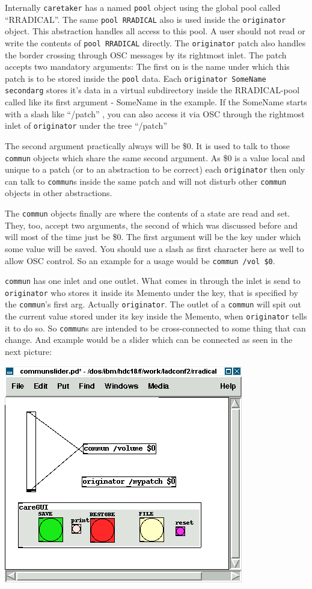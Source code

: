 \documentclass[10pt,english]{scrartcl}
\begin{document}
Internally \texttt{caretaker} has a named \texttt{pool} object using the global pool
called ``RRADICAL''. The same \texttt{pool RRADICAL} also is used inside the
\texttt{originator} object. This abstraction handles all access to this pool. A
user should not read or write the contents of \texttt{pool RRADICAL} directly.
The \texttt{originator} patch also handles the border crossing through OSC
messages by its rightmost inlet. The patch accepts two mandatory
arguments: The first on is the name under which this patch is to be stored
inside the \texttt{pool} data. Each \texttt{originator SomeName secondarg}  stores
it's data in a virtual subdirectory inside the RRADICAL-pool called like
its first argument - SomeName in the example. If the SomeName starts with a
slash like ``/patch'' , you can also access it via OSC through the rightmost inlet of
\texttt{originator} under the tree ``/patch''

The second argument practically always will be {\$}0. It is used to talk to
those \texttt{commun} objects which share the same second argument. As {\$}0 is a
value local and unique to a patch (or to an abstraction to be correct) each
\texttt{originator} then only can talk to \texttt{commun}s inside the same patch and
will not disturb other \texttt{commun} objects in other abstractions.

The \texttt{commun} objects finally are where the contents of a state are read
and set. They, too, accept two arguments, the second of which was
discussed before and will most of the time just be {\$}0. The first argument
will be the key under which some value will be saved. You should use a slash
as first character here as well to allow OSC control. So an example for a
usage would be \texttt{commun /vol {\$}0}.

\texttt{commun} has one inlet and one outlet. What comes in through the inlet is
send to \texttt{originator} who stores it inside its Memento under the key, that
is specified by the \texttt{commun}'s first arg. Actually \texttt{originator}. The
outlet of a \texttt{commun} will spit out the current value stored under its key
inside the Memento, when \texttt{originator} tells it to do so. So \texttt{commun}s
are intended to be cross-connected to some thing that can change. And
example would be a slider which can be connected as seen in the next
picture:

\includegraphics{communslider.png}
\end{document}
